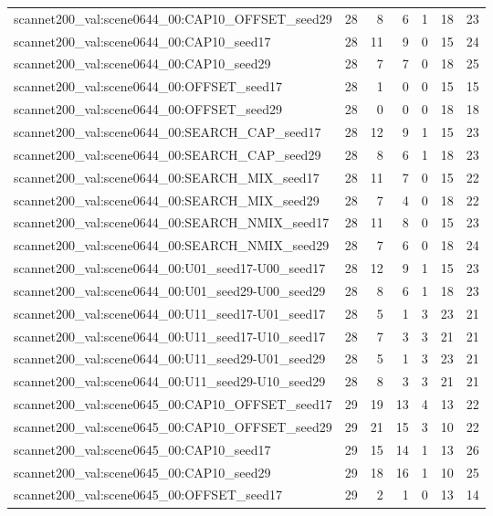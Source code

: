 \begin{table}[t]
\begin{tabular}{lrrrrrr}
scannet200\_val:scene0644\_00:CAP10\_OFFSET\_seed29 & 28 & 8 & 6 & 1 & 18 & 23 \\
scannet200\_val:scene0644\_00:CAP10\_seed17 & 28 & 11 & 9 & 0 & 15 & 24 \\
scannet200\_val:scene0644\_00:CAP10\_seed29 & 28 & 7 & 7 & 0 & 18 & 25 \\
scannet200\_val:scene0644\_00:OFFSET\_seed17 & 28 & 1 & 0 & 0 & 15 & 15 \\
scannet200\_val:scene0644\_00:OFFSET\_seed29 & 28 & 0 & 0 & 0 & 18 & 18 \\
scannet200\_val:scene0644\_00:SEARCH\_CAP\_seed17 & 28 & 12 & 9 & 1 & 15 & 23 \\
scannet200\_val:scene0644\_00:SEARCH\_CAP\_seed29 & 28 & 8 & 6 & 1 & 18 & 23 \\
scannet200\_val:scene0644\_00:SEARCH\_MIX\_seed17 & 28 & 11 & 7 & 0 & 15 & 22 \\
scannet200\_val:scene0644\_00:SEARCH\_MIX\_seed29 & 28 & 7 & 4 & 0 & 18 & 22 \\
scannet200\_val:scene0644\_00:SEARCH\_NMIX\_seed17 & 28 & 11 & 8 & 0 & 15 & 23 \\
scannet200\_val:scene0644\_00:SEARCH\_NMIX\_seed29 & 28 & 7 & 6 & 0 & 18 & 24 \\
scannet200\_val:scene0644\_00:U01\_seed17-U00\_seed17 & 28 & 12 & 9 & 1 & 15 & 23 \\
scannet200\_val:scene0644\_00:U01\_seed29-U00\_seed29 & 28 & 8 & 6 & 1 & 18 & 23 \\
scannet200\_val:scene0644\_00:U11\_seed17-U01\_seed17 & 28 & 5 & 1 & 3 & 23 & 21 \\
scannet200\_val:scene0644\_00:U11\_seed17-U10\_seed17 & 28 & 7 & 3 & 3 & 21 & 21 \\
scannet200\_val:scene0644\_00:U11\_seed29-U01\_seed29 & 28 & 5 & 1 & 3 & 23 & 21 \\
scannet200\_val:scene0644\_00:U11\_seed29-U10\_seed29 & 28 & 8 & 3 & 3 & 21 & 21 \\
scannet200\_val:scene0645\_00:CAP10\_OFFSET\_seed17 & 29 & 19 & 13 & 4 & 13 & 22 \\
scannet200\_val:scene0645\_00:CAP10\_OFFSET\_seed29 & 29 & 21 & 15 & 3 & 10 & 22 \\
scannet200\_val:scene0645\_00:CAP10\_seed17 & 29 & 15 & 14 & 1 & 13 & 26 \\
scannet200\_val:scene0645\_00:CAP10\_seed29 & 29 & 18 & 16 & 1 & 10 & 25 \\
scannet200\_val:scene0645\_00:OFFSET\_seed17 & 29 & 2 & 1 & 0 & 13 & 14 \\

\end{tabular}
\end{table}
